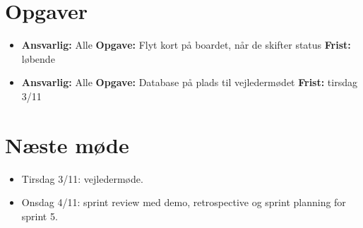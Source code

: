 \documentclass[a4paper,11pt]{article}
\begin{document}
\section*{Opgaver}

\begin{itemize}
    \item \textbf{Ansvarlig:} Alle \textbf{Opgave:} Flyt kort på boardet, når de skifter status \textbf{Frist:} løbende
    \item \textbf{Ansvarlig:} Alle \textbf{Opgave:} Database på plads til vejledermødet \textbf{Frist:} tirsdag 3/11
\end{itemize}

\section*{Næste møde}

\begin{itemize}
    \item Tirsdag 3/11: vejledermøde.
    \item Onsdag 4/11: sprint review med demo, retrospective og sprint planning for sprint 5.
\end{itemize}
\end{document}
